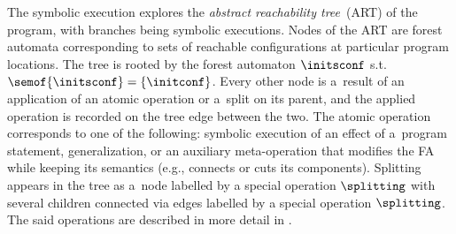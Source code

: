 %
%
%
The symbolic execution explores the
\emph{abstract reachability tree}~(ART) of the program, with branches being symbolic executions.
Nodes of the ART are forest automata corresponding to sets of reachable configurations
at particular program locations.
The tree is rooted by the forest automaton $\initsconf$ s.t. $\semof{\initsconf} = \{\initconf\}$. 
Every other node is a~result of an application of an atomic operation or
a~split on its parent,
and the applied operation is recorded on the tree edge between the two.
The atomic operation corresponds to one of the following: symbolic execution of an effect of
a~program statement, generalization, or an auxiliary meta-operation that modifies
the FA while keeping its semantics (e.g., connects or cuts its components).
Splitting appears in the tree as a~node labelled by a special operation $\splitting$ with several children connected via edges labelled by a special operation $\splitting$. 
The said operations are described in more detail in .
%
%
%
%


